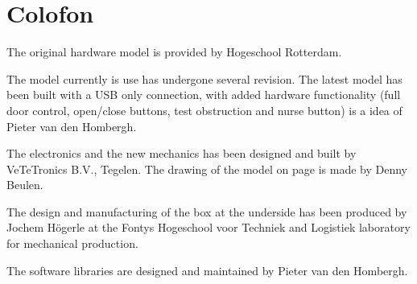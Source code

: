 \section*{Colofon}

The original hardware model is provided by Hogeschool Rotterdam.

The model currently is use has undergone several revision. The latest model has been built with a USB only connection, with added hardware functionality (full door control, open/close buttons, test obstruction and nurse button) is a idea of Pieter van den Hombergh.

The electronics and the new mechanics has been designed and built  by VeTeTronics B.V., Tegelen. The drawing of the model on page \pageref{fig:lift} is made by Denny Beulen.

The design and manufacturing of the box at the underside has been
produced by Jochem Högerle at the Fontys Hogeschool voor Techniek and
Logistiek laboratory for mechanical production. 

The software libraries are designed and maintained by Pieter van den Hombergh.

